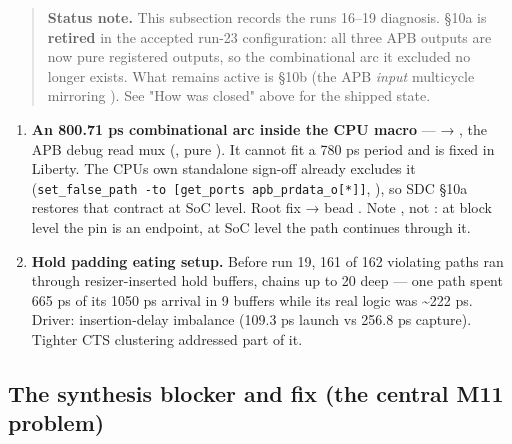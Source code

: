 \begin{record}

\begin{quote}
\textbf{Status note.} This subsection records the runs 16--19 diagnosis.
§10a is \textbf{retired} in the accepted run-23 configuration: all three
APB outputs are now pure registered outputs, so the combinational arc it
excluded no longer exists. What remains active is §10b (the APB
\emph{input} multicycle mirroring ). See "How
 was closed" above for the shipped state.
\end{quote}

\begin{enumerate}
\def\labelenumi{\arabic{enumi}.}
\tightlist
\item
  \textbf{An 800.71 ps combinational arc inside the CPU macro} ---
   → , the APB debug read mux
  (, pure ). It cannot
  fit a 780 ps period and is fixed in Liberty. The CPU\textquotesingle s
  own standalone sign-off already excludes it
  (\texttt{set\_\allowbreak{}false\_\allowbreak{}path\ -\allowbreak{}to\ [get\_\allowbreak{}ports\ apb\_\allowbreak{}prdata\_\allowbreak{}o[*]]},
  ), so SDC §10a restores
  that contract at SoC level. Root fix → bead . Note
  , not : at block level the pin is an
  endpoint, at SoC level the path continues through it.
\item
  \textbf{Hold padding eating setup.} Before run 19, 161 of 162
  violating paths ran through resizer-inserted  hold
  buffers, chains up to 20 deep --- one path spent 665 ps of its 1050 ps
  arrival in 9 buffers while its real logic was \textasciitilde222 ps.
  Driver:  insertion-delay imbalance (109.3 ps launch vs
  256.8 ps capture). Tighter CTS clustering addressed part of it.
\end{enumerate}

\end{record}

\subsection{The synthesis blocker and fix (the central M11 problem)}\label{cr:run:phase5:the-synthesis-blocker-and-fix-the-central-m11-problem}

